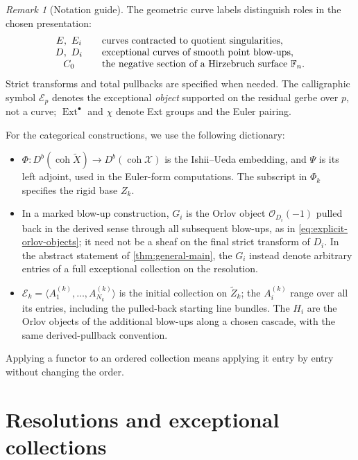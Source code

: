 \documentclass[11pt]{article}
\theoremstyle{plain}
\theoremstyle{definition}
\theoremstyle{remark}
\newtheorem{remark}[remark]{Remark}
\newcommand{\F}{\mathbb F}
\newcommand{\Db}{D^b}
\newcommand{\coh}{\operatorname{coh}}
\newcommand{\Ext}{\operatorname{Ext}}
\newcommand{\XX}{\mathcal X}
\newcommand{\OO}{\mathcal O}
\begin{document}
\begin{remark}[Notation guide]\label{rem:curve-notation}
The geometric curve labels distinguish roles in the chosen presentation:
\[
\begin{array}{c@{\qquad}l}
E,\ E_i&\text{curves contracted to quotient singularities},\\
D,\ D_i&\text{exceptional curves of smooth point blow-ups},\\
C_0&\text{the negative section of a Hirzebruch surface }\F_n.
\end{array}
\]
Strict transforms and total pullbacks are specified when needed.
The calligraphic symbol \(\mathcal E_p\) denotes the exceptional
\emph{object} supported on the residual gerbe over \(p\), not a curve;
\(\Ext^\bullet\) and \(\chi\) denote Ext groups and the Euler pairing.

For the categorical constructions, we use the following dictionary:
\begin{itemize}[leftmargin=*,itemsep=2pt]
\item \(\Phi:\Db(\coh\widetilde X)\to\Db(\coh\XX)\) is the
Ishii--Ueda embedding, and \(\Psi\) is its left adjoint, used in the
Euler-form computations. The subscript in \(\Phi_k\) specifies the
rigid base \(Z_k\).
\item In a marked blow-up construction, \(G_i\) is the Orlov object
\(\OO_{D_i}(-1)\) pulled back in the derived sense through all subsequent
blow-ups, as in \eqref{eq:explicit-orlov-objects}; it need not be a sheaf
on the final strict transform of \(D_i\). In the abstract statement of
\cref{thm:general-main}, the \(G_i\) instead denote arbitrary entries
of a full exceptional collection on the resolution.
\item \(\mathscr E_k=\langle A^{(k)}_1,\ldots,A^{(k)}_{N_k}\rangle\)
is the initial collection on \(\widetilde Z_k\); the \(A^{(k)}_i\)
range over all its entries, including the pulled-back starting line
bundles. The \(H_i\) are the Orlov objects of the additional blow-ups
along a chosen cascade, with the same derived-pullback convention.
\end{itemize}
Applying a functor to an ordered collection means applying it entry by
entry without changing the order.
\end{remark}

\section{Resolutions and exceptional collections}
\label{sec:rationality}
\label{sec:orlov}
\end{document}
